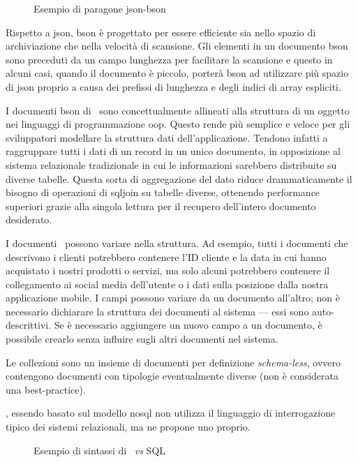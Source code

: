 \begin{figure}[!h] 
	\centering    
	
	\caption[Esempio di paragone \acrshort{json}-\acrshort{bson}]{Esempio di paragone \acrshort{json}-\acrshort{bson}}
	\label{fig:json-bson}
\end{figure}
\noindent
Rispetto a \acrshort{json}, \acrshort{bson} è progettato per essere efficiente sia nello spazio di archiviazione che nella velocità di scansione. Gli elementi in un documento \acrshort{bson} sono preceduti da un campo lunghezza per facilitare la scansione e questo in alcuni casi, quando il documento è piccolo,  porterà \acrshort{bson} ad utilizzare più spazio di \acrshort{json} proprio a causa dei prefissi di lunghezza e degli indici di array espliciti.

I documenti \acrshort{bson} di \mongodb~sono concettualmente allineati alla struttura di un oggetto nei linguaggi di programmazione \acrshort{oop}. Questo rende più semplice e veloce per gli sviluppatori modellare la struttura dati dell'applicazione. Tendono infatti a raggruppare tutti i dati di un record in un unico documento, in opposizione al sistema relazionale tradizionale in cui le informazioni sarebbero distribuite su diverse tabelle. Questa sorta di aggregazione del dato riduce drammaticamente il bisogno di operazioni di \gls{sqljoin} su tabelle diverse, ottenendo performance superiori grazie alla singola lettura per il recupero dell'intero documento desiderato.

I documenti \mongodb~possono variare nella struttura. Ad esempio, tutti i documenti che descrivono i clienti potrebbero contenere l'ID cliente e la data in cui hanno acquistato i nostri prodotti o servizi, ma solo alcuni potrebbero contenere il collegamento ai social media dell'utente o i dati sulla posizione dalla nostra applicazione mobile. I campi possono variare da un documento all'altro; non è necessario dichiarare la struttura dei documenti al sistema --- essi sono auto-descrittivi. Se è necessario aggiungere un nuovo campo a un documento, è possibile crearlo senza influire sugli altri documenti nel sistema.

Le collezioni sono un insieme di documenti per  definizione \textit{schema-less}, ovvero contengono documenti con tipologie eventualmente diverse (non è considerata una best-practice).

\mongodb, essendo basato sul modello \acrshort{nosql} non utilizza il linguaggio di interrogazione tipico dei sistemi relazionali, ma ne propone uno proprio.
\begin{figure}[H] 
	\centering    

	\caption[Esempio di sintassi di \mongodb]{Esempio di sintassi di \mongodb~\textit{vs} SQL}
	\label{fig:mongodb-syntax-example}
\end{figure}

